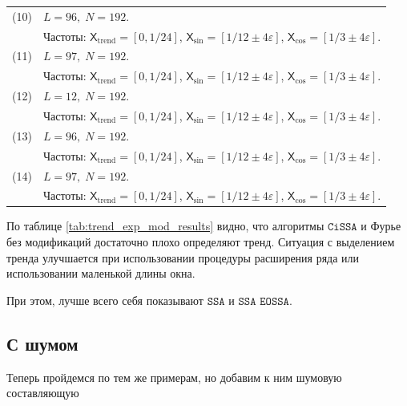 \documentclass[12pt, specialist, subf
]{disser}
\theoremstyle{definition}
\newcommand{\SSA}{\texttt{SSA}}
\newcommand{\EOSSA}{\texttt{SSA EOSSA}}
\newcommand{\CISSA}{\texttt{CiSSA}}
\newcommand{\TS}{\mathsf{X}}
\begin{document}
\begin{table}[H]
\begin{tabularx}{\textwidth}{|c|X|}
    \hline
    (10) & \(L = 96,\; N = 192\). \\
         & Частоты: \(\TS_{\text{trend}} = [0,1/24]\), \(\TS_{\sin} = [1/12\pm4\varepsilon]\), \(\TS_{\cos} = [1/3\pm4\varepsilon]\). \\
    \hline
    (11) & \(L = 97,\; N = 192\). \\
         & Частоты: \(\TS_{\text{trend}} = [0,1/24]\), \(\TS_{\sin} = [1/12\pm4\varepsilon]\), \(\TS_{\cos} = [1/3\pm4\varepsilon]\). \\
    \hline
    (12) & \(L = 12,\; N = 192\). \\
         & Частоты: \(\TS_{\text{trend}} = [0,1/24]\), \(\TS_{\sin} = [1/12\pm4\varepsilon]\), \(\TS_{\cos} = [1/3\pm4\varepsilon]\). \\
    \hline
    (13) & \(L = 96,\; N = 192\). \\
         & Частоты: \(\TS_{\text{trend}} = [0,1/24]\), \(\TS_{\sin} = [1/12\pm4\varepsilon]\), \(\TS_{\cos} = [1/3\pm4\varepsilon]\). \\
    \hline
    (14) & \(L = 97,\; N = 192\). \\
         & Частоты: \(\TS_{\text{trend}} = [0,1/24]\), \(\TS_{\sin} = [1/12\pm4\varepsilon]\), \(\TS_{\cos} = [1/3\pm4\varepsilon]\). \\
    \hline
  \end{tabularx}
\end{table}





По таблице \ref{tab:trend_exp_mod_results} видно, что алгоритмы $\CISSA$ и Фурье без модификаций достаточно плохо определяют тренд. Ситуация с выделением тренда улучшается при использовании процедуры расширения ряда или использовании маленькой длины окна.

При этом, лучше всего себя показывают $\SSA$ и $\EOSSA$. 


\subsection{С шумом}
\label{subsec:cissa_examples_with_noise}

Теперь пройдемся по тем же примерам, но добавим к ним шумовую составляющую
\end{document}
